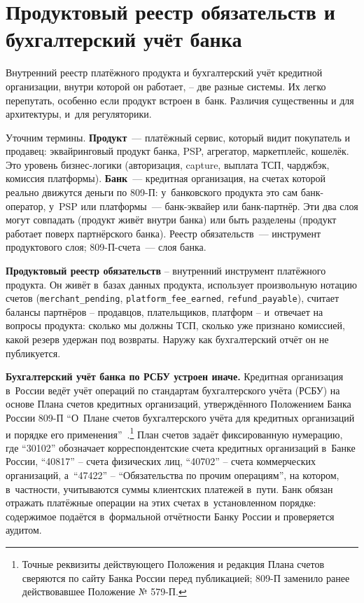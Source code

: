 \section{Продуктовый реестр обязательств и бухгалтерский учёт банка}\label{sec:ledger-vs-accounting}

Внутренний реестр платёжного продукта и бухгалтерский учёт
кредитной организации, внутри которой он работает, -- две разные
системы. Их легко перепутать, особенно если продукт встроен в~банк.
Различия существенны и для архитектуры, и~для регуляторики.

Уточним термины. \textbf{Продукт}~--- платёжный сервис, который видит
покупатель и продавец: эквайринговый продукт банка, PSP, агрегатор,
маркетплейс, кошелёк. Это уровень бизнес-логики (авторизация, capture,
выплата ТСП, чарджбэк, комиссия платформы). \textbf{Банк}~--- кредитная
организация, на счетах которой реально движутся деньги по 809-П:
у~банковского продукта это сам банк-оператор, у~PSP или платформы~---
банк-эквайер или банк-партнёр. Эти два слоя могут совпадать (продукт
живёт внутри банка) или быть разделены (продукт работает поверх
партнёрского банка). Реестр обязательств~--- инструмент продуктового
слоя; 809-П-счета~--- слоя банка.

\textbf{Продуктовый реестр обязательств} -- внутренний инструмент
платёжного продукта. Он живёт в~базах данных продукта, использует
произвольную нотацию счетов (\texttt{merchant\_pending},
\texttt{platform\_fee\_earned}, \texttt{refund\_payable}), считает
балансы партнёров -- продавцов, плательщиков, платформ -- и~отвечает
на вопросы продукта: сколько мы должны ТСП, сколько уже признано
комиссией, какой резерв удержан под возвраты. Наружу как
бухгалтерский отчёт он не публикуется.

\textbf{Бухгалтерский учёт банка по РСБУ устроен иначе.} Кредитная организация
в~России ведёт учёт операций по стандартам бухгалтерского
учёта (РСБУ) на основе Плана счетов кредитных организаций,
утверждённого Положением Банка России 809-П \enquote{О~Плане счетов
бухгалтерского учёта для кредитных организаций и порядке его
применения}~\cite{cbr-809p}.\footnote{Точные реквизиты действующего
Положения и редакция Плана счетов сверяются по сайту Банка России
перед публикацией; 809-П заменило ранее действовавшее Положение
№ 579-П.} План счетов задаёт фиксированную нумерацию, где
\enquote{30102} обозначает корреспондентские счета кредитных
организаций в~Банке России, \enquote{40817} -- счета физических лиц,
\enquote{40702} -- счета коммерческих организаций, а~\enquote{47422} --
\enquote{Обязательства по прочим операциям}, на котором,
в~частности, учитываются суммы клиентских платежей в~пути. Банк
обязан отражать платёжные операции на этих счетах в~установленном
порядке: содержимое подаётся в~формальной отчётности
Банку России и проверяется аудитом.

